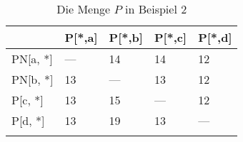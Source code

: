 
\begin{longtable}[c]{|l|l|l|l|l|}
\hline
             & P{[}*,a{]} & P{[}*,b{]} & P{[}*,c{]} & P{[}*,d{]} \\ \hline
\endfirsthead
%
\endhead
%
PN{[}a, *{]} & ---        & 14         & 14         & 12         \\ \hline
PN{[}b, *{]} & 13         & ---        & 13         & 12         \\ \hline
P{[}c, *{]}  & 13         & 15         & ---        & 12         \\ \hline
P{[}d, *{]}  & 13         & 19         & 13         & ---        \\ \hline
\caption{Die Menge $P$ in Beispiel 2}
\label{beispiel2p}\\
\end{longtable}